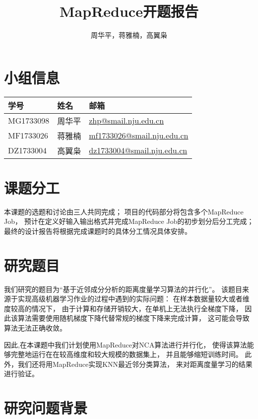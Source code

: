 \documentclass[a4paper,UTF8]{article}
\theoremstyle{definition}
\begin{document}
\title{MapReduce开题报告}
\author{周华平，蒋雅楠，高翼枭}
\maketitle 

\section*{小组信息}

\begin{table}[htbp]
  \centering
  \begin{tabular}{l|l|l}
	\hline
	学号 & 姓名 & 邮箱 \\
	\hline
	MG1733098 & 周华平 & \url{zhp@smail.nju.edu.cn} \\
	MF1733026 & 蒋雅楠 & \url{mf1733026@smail.nju.edu.cn} \\
	DZ1733004 & 高翼枭 & \url{dz1733004@smail.nju.edu.cn} \\
	\hline
  \end{tabular}
\end{table}

\section*{课题分工}

本课题的选题和讨论由三人共同完成；
项目的代码部分将包含多个MapReduce Job，
预计在定义好输入输出格式并完成MapReduce Job的初步划分后分工完成；
最终的设计报告将根据完成课题时的具体分工情况具体安排。

\section*{研究题目}

我们研究的题目为“基于近邻成分分析的距离度量学习算法的并行化”。
该题目来源于实现高级机器学习作业的过程中遇到的实际问题：
在样本数据量较大或者维度较高的情况下，
由于计算和存储开销较大，在单机上无法执行全梯度下降，
因此该算法需要使用随机梯度下降代替常规的梯度下降来完成计算，
这可能会导致算法无法正确收敛。

因此,在本课题中我们计划使用MapReduce对NCA算法进行并行化，
使得该算法能够完整地运行在在较高维度和较大规模的数据集上，
并且能够缩短训练时间。
此外，我们还将用MapReduce实现KNN最近邻分类算法，
来对距离度量学习的结果进行验证。

\section*{研究问题背景}
\end{document}
